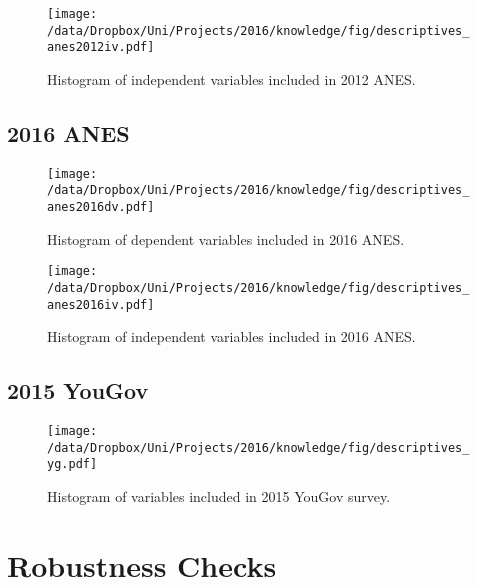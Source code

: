 \begin{figure}[h]\centering
\texttt{[image: /data/Dropbox/Uni/Projects/2016/knowledge/fig/descriptives\_anes2012iv.pdf]}
\caption{Histogram of independent variables included in 2012 ANES.}\label{fig:descriptives_anes2012iv}
\end{figure}

\clearpage
\subsection{2016 ANES}
\begin{figure}[h]\centering
\texttt{[image: /data/Dropbox/Uni/Projects/2016/knowledge/fig/descriptives\_anes2016dv.pdf]}
\caption{Histogram of dependent variables included in 2016 ANES.}\label{fig:descriptives_anes2016dv}
\end{figure}

\begin{figure}[h]\centering
\texttt{[image: /data/Dropbox/Uni/Projects/2016/knowledge/fig/descriptives\_anes2016iv.pdf]}
\caption{Histogram of independent variables included in 2016 ANES.}\label{fig:descriptives_anes2016iv}
\end{figure}

\clearpage
\subsection{2015 YouGov}

\begin{figure}[h]\centering
\texttt{[image: /data/Dropbox/Uni/Projects/2016/knowledge/fig/descriptives\_yg.pdf]}
\caption{Histogram of variables included in 2015 YouGov survey.}\label{fig:descriptives_yg}
\end{figure}


\clearpage
\section{Robustness Checks}
\renewcommand\thefigure{D.\arabic{figure}}
\renewcommand\thetable{D.\arabic{table}}
\setcounter{figure}{0}
\setcounter{table}{0}

